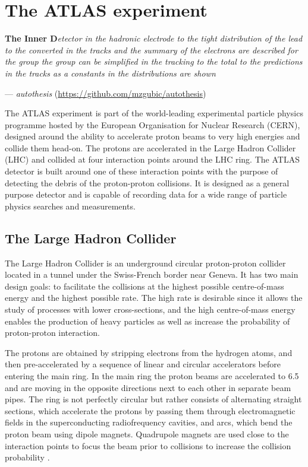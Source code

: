 \chapter{The ATLAS experiment}

\textbf{The Inner D}\textit{etector in the hadronic electrode to the tight distribution of the lead to the converted in the tracks and the summary of the electrons are described for the group the group can be simplified in the tracking to the total to the predictions in the tracks as a constants in the distributions are shown}
\vspace{5mm}
\begin{flushright}
--- \textit{autothesis} (\url{https://github.com/mzgubic/autothesis})
\end{flushright}

\thispagestyle{empty}
\newpage

\noindent
The ATLAS experiment is part of the world-leading experimental particle
physics programme hosted by the European Organisation for Nuclear Research
(CERN), designed around the ability to accelerate proton beams to very high
energies and collide them head-on. The protons are accelerated in the Large
Hadron Collider (LHC) and collided at four interaction points
around the LHC ring. The ATLAS detector is built around one of these
interaction points with the purpose of detecting the debris of the
proton-proton collisions. It is designed as a general purpose detector
and is capable of recording data for a wide range of particle physics
searches and measurements.

\section{The Large Hadron Collider}

The Large Hadron Collider is an underground circular proton-proton collider
located in a tunnel under the Swiss-French border near Geneva. It has two
main design goals: to facilitate the collisions at the highest possible
centre-of-mass energy and the highest possible rate. The high rate is
desirable since it allows the study of processes with lower cross-sections, and
the high centre-of-mass energy enables the production of heavy particles as
well as increase the probability of proton-proton interaction.

The protons are obtained by stripping electrons from the hydrogen atoms,
and then pre-accelerated by a sequence of linear and circular accelerators
before entering the main ring. In the main ring the proton beams are
accelerated to 6.5 \TeV and are moving in the opposite directions next to each other
in separate beam pipes. The ring is not perfectly circular but rather consists
of alternating straight sections, which accelerate the protons by passing
them through electromagnetic fields in the superconducting radiofrequency
cavities, and arcs, which bend the proton beam using dipole magnets.
Quadrupole magnets are used close to the interaction points to focus the
beam prior to collisions to increase the collision probability \cite{Brüning:782076}. 


